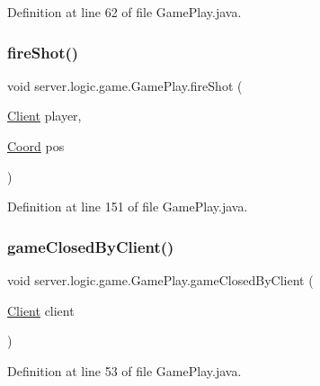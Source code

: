 Definition at line 62 of file Game\+Play.\+java.

\hypertarget{classserver_1_1logic_1_1game_1_1_game_play_a3976c3d5e4c1b82cdffc28857e8c0a20}{}\label{classserver_1_1logic_1_1game_1_1_game_play_a3976c3d5e4c1b82cdffc28857e8c0a20} 
\subsubsection{\texorpdfstring{fire\+Shot()}{fireShot()}}
{\footnotesize\ttfamily void server.\+logic.\+game.\+Game\+Play.\+fire\+Shot (\begin{DoxyParamCaption}\item[{\hyperlink{classserver_1_1conn_1_1_client}{Client}}]{player,  }\item[{\hyperlink{classsharedlib_1_1utils_1_1_coord}{Coord}}]{pos }\end{DoxyParamCaption})}



Definition at line 151 of file Game\+Play.\+java.

\hypertarget{classserver_1_1logic_1_1game_1_1_game_play_a7cab0c261d2f0df0dcb3aa6245b40ada}{}\label{classserver_1_1logic_1_1game_1_1_game_play_a7cab0c261d2f0df0dcb3aa6245b40ada} 
\subsubsection{\texorpdfstring{game\+Closed\+By\+Client()}{gameClosedByClient()}}
{\footnotesize\ttfamily void server.\+logic.\+game.\+Game\+Play.\+game\+Closed\+By\+Client (\begin{DoxyParamCaption}\item[{\hyperlink{classserver_1_1conn_1_1_client}{Client}}]{client }\end{DoxyParamCaption})}



Definition at line 53 of file Game\+Play.\+java.

\hypertarget{classserver_1_1logic_1_1game_1_1_game_play_aa4469a87744a6771f37f82267180b222}{}\label{classserver_1_1logic_1_1game_1_1_game_play_aa4469a87744a6771f37f82267180b222} 
